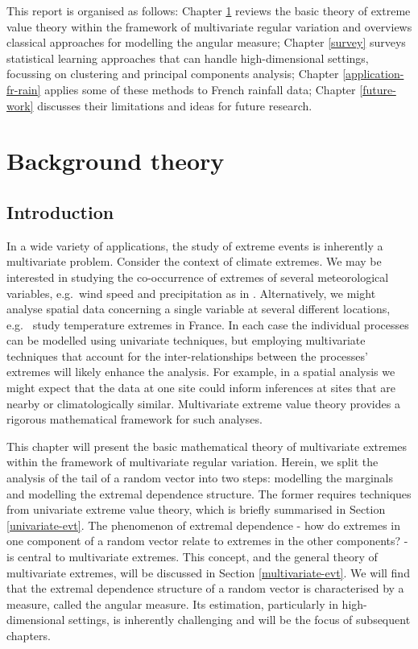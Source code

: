 \documentclass[en-GB, a4paper, nobind]{templates/bathreport}
\begin{document}
This report is organised as follows: Chapter \ref{background-theory} reviews the basic theory of extreme value theory within the framework of multivariate regular variation and overviews classical approaches for modelling the angular measure; Chapter \ref{survey} surveys statistical learning approaches that can handle high-dimensional settings, focussing on clustering and principal components analysis; Chapter \ref{application-fr-rain} applies some of these methods to French rainfall data; Chapter \ref{future-work} discusses their limitations and ideas for future research.

\hypertarget{background-theory}{%
\chapter{Background theory}\label{background-theory}}

\minitoc

\noindent

\hypertarget{introduction-1}{%
\section{Introduction}\label{introduction-1}}

In a wide variety of applications, the study of extreme events is inherently a multivariate problem. Consider the context of climate extremes. We may be interested in studying the co-occurrence of extremes of several meteorological variables, e.g.~wind speed and precipitation as in \textcite{vignottoClusteringBivariateDependencies2021}. Alternatively, we might analyse spatial data concerning a single variable at several different locations, e.g.~\textcite{badorFutureSummerMegaheatwave2017} study temperature extremes in France. In each case the individual processes can be modelled using univariate techniques, but employing multivariate techniques that account for the inter-relationships between the processes' extremes will likely enhance the analysis. For example, in a spatial analysis we might expect that the data at one site could inform inferences at sites that are nearby or climatologically similar. Multivariate extreme value theory provides a rigorous mathematical framework for such analyses.

This chapter will present the basic mathematical theory of multivariate extremes within the framework of multivariate regular variation. Herein, we split the analysis of the tail of a random vector into two steps: modelling the marginals and modelling the extremal dependence structure. The former requires techniques from univariate extreme value theory, which is briefly summarised in Section \ref{univariate-evt}. The phenomenon of extremal dependence - how do extremes in one component of a random vector relate to extremes in the other components? - is central to multivariate extremes. This concept, and the general theory of multivariate extremes, will be discussed in Section \ref{multivariate-evt}. We will find that the extremal dependence structure of a random vector is characterised by a measure, called the angular measure. Its estimation, particularly in high-dimensional settings, is inherently challenging and will be the focus of subsequent chapters.
\end{document}
